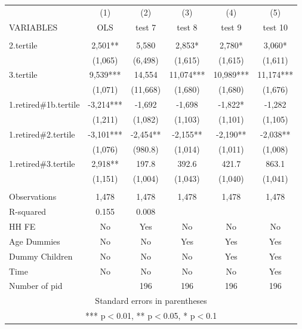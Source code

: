 \begin{tabular}{lccccc} \hline
 & (1) & (2) & (3) & (4) & (5) \\
VARIABLES & OLS & test 7 & test 8 & test 9 & test 10 \\ \hline
 &  &  &  &  &  \\
2.tertile & 2,501** & 5,580 & 2,853* & 2,780* & 3,060* \\
 & (1,065) & (6,498) & (1,615) & (1,615) & (1,611) \\
3.tertile & 9,539*** & 14,554 & 11,074*** & 10,989*** & 11,174*** \\
 & (1,071) & (11,668) & (1,680) & (1,680) & (1,676) \\
1.retired\#1b.tertile & -3,214*** & -1,692 & -1,698 & -1,822* & -1,282 \\
 & (1,211) & (1,082) & (1,103) & (1,101) & (1,105) \\
1.retired\#2.tertile & -3,101*** & -2,454** & -2,155** & -2,190** & -2,038** \\
 & (1,076) & (980.8) & (1,014) & (1,011) & (1,008) \\
1.retired\#3.tertile & 2,918** & 197.8 & 392.6 & 421.7 & 863.1 \\
 & (1,151) & (1,004) & (1,043) & (1,040) & (1,041) \\
 &  &  &  &  &  \\
Observations & 1,478 & 1,478 & 1,478 & 1,478 & 1,478 \\
R-squared & 0.155 & 0.008 &  &  &  \\
HH FE & No & Yes & No & No & No \\
Age Dummies & No & No & Yes & Yes & Yes \\
Dummy Children & No & No & No & Yes & Yes \\
Time & No & No & No & No & Yes \\
 Number of pid &  & 196 & 196 & 196 & 196 \\ \hline
\multicolumn{6}{c}{ Standard errors in parentheses} \\
\multicolumn{6}{c}{ *** p$<$0.01, ** p$<$0.05, * p$<$0.1} \\
\end{tabular}
